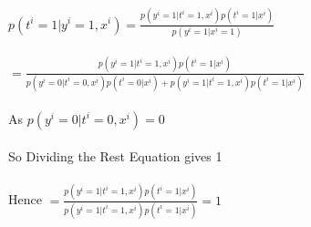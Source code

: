 \newcommand\tab[1][1cm]{\hspace*{#1}}
\begin{answer}
  \\ \\ 
  \tab$p(t^i = 1 | y^i = 1, x^i) = \frac{p(y^i=1|t^i=1,x^i)p(t^i=1|x^i)}{p(y^i=1|x^i=1)}$ \\ \\
   \tab[2.25cm]$ = \frac{p(y^i=1|t^i=1,x^i)p(t^i=1|x^i)}{p(y^i=0|t^i=0,x^i)p(t^i=0|x^i) + p(y^i=1|t^i=1,x^i)p(t^i=1|x^i)}$ \\ \\
   As $p(y^i=0|t^i=0,x^i) = 0$ \\ \\ 
   So Dividing the Rest Equation gives 1 \\ \\
   Hence 
    \tab[2.25cm]$ = \frac{p(y^i=1|t^i=1,x^i)p(t^i=1|x^i)}{p(y^i=1|t^i=1,x^i)p(t^i=1|x^i)} = 1$
\end{answer}
 